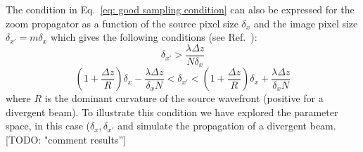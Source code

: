 \documentclass{iucr}              %
\newcommand{\todo}[1]{{\color{red}[TODO: "#1'']}}
\begin{document}
The condition in Eq.~\ref{eq: good sampling condition} can also be expressed for the zoom propagator as a function of the source pixel size $\delta_x$ and the image pixel size $\delta_{x'}=m \delta_x$ which gives the following conditions (see Ref.~\cite{pirro}):
\begin{equation}\label{eq: good sampling pirro condition one}
\delta_{x'} > \frac{\lambda \Delta z}{N \delta_x}
\end{equation}
\begin{equation}\label{eq: good sampling pirro condition two}
\left(1+\frac{\Delta z}{R}\right) \delta_x -
\frac{\lambda \Delta z}{\delta_x N}
< \delta_{x'} < 
\left( 1 + \frac{\Delta z}{R}\right) \delta_x + \frac{\lambda \Delta z}{\delta_x N}
\end{equation}
where $R$ is the dominant curvature of the source wavefront (positive for a divergent beam). To illustrate this condition we have explored the parameter space, in this case ($\delta_x,\delta_{x'}$ and simulate the propagation of a divergent beam. \todo{comment results}
\end{document}
